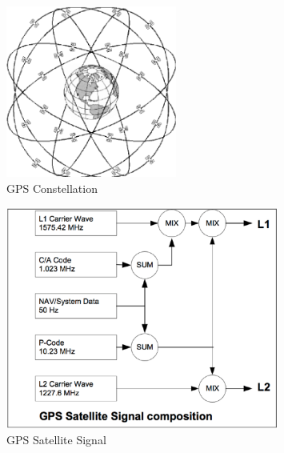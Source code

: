 \begin{figure}[htb] 
	\label{fig:gps_constellation}
	\centering
	\includegraphics[width=0.5\textwidth]{figures/gps_constellation}
	\caption{GPS Constellation}
\end{figure}

\begin{figure}[htb] 
	\label{fig:gps_signal}
	\centering
	\includegraphics[width=0.8\textwidth]{figures/gps_signal}
	\caption{GPS Satellite Signal}
\end{figure}

